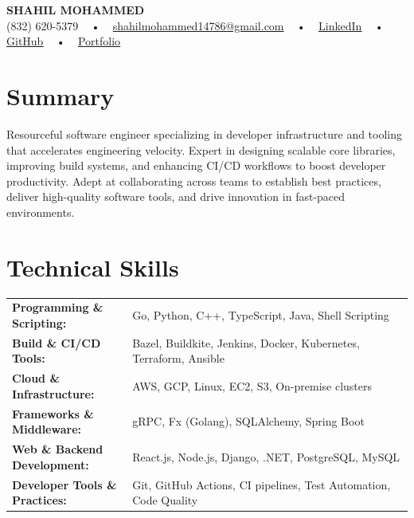 \documentclass[letterpaper,11pt]{article}
\begin{document}
\begin{center}
    {\fontsize{14pt}{12pt}\selectfont \textbf{\MakeUppercase{Shahil Mohammed}}}\\ \vspace{2pt}
    \fontsize{10pt}{12pt}\selectfont (832) 620-5379 ~ • ~ \href{mailto:shahilmohammed14786@gmail.com}{shahilmohammed14786@gmail.com} ~ • ~  
    \href{https://www.linkedin.com/in/shahil-mohammed-9652931a1/}{\color{blue}\underline{LinkedIn}}  ~ • ~ 
    \href{https://github.com/freakbeast14}{\color{blue}\underline{GitHub}} ~ • ~ 
    \href{https://shahil-mohammed.netlify.app/}{\color{blue}\underline{Portfolio}}
    \vspace{-8pt}
\end{center}

\section{Summary}
\fontsize{9pt}{10pt}\selectfont
Resourceful software engineer specializing in developer infrastructure and tooling that accelerates engineering velocity. Expert in designing scalable core libraries, improving build systems, and enhancing CI/CD workflows to boost developer productivity. Adept at collaborating across teams to establish best practices, deliver high-quality software tools, and drive innovation in fast-paced environments.
 \vspace{-5pt}
 
\section{Technical Skills}
        \vspace{-14pt}
        \begin{table}[h]
            \fontsize{9pt}{10pt}\selectfont
            \begin{tabular}{p{0.3\linewidth} p{0.7\linewidth}}
                \textbf{Programming \& Scripting:} & Go, Python, C++, TypeScript, Java, Shell Scripting \\
                \textbf{Build \& CI/CD Tools:} & Bazel, Buildkite, Jenkins, Docker, Kubernetes, Terraform, Ansible \\
                \textbf{Cloud \& Infrastructure:} & AWS, GCP, Linux, EC2, S3, On-premise clusters \\
                \textbf{Frameworks \& Middleware:} & gRPC, Fx (Golang), SQLAlchemy, Spring Boot \\
                \textbf{Web \& Backend Development:} & React.js, Node.js, Django, .NET, PostgreSQL, MySQL \\
                \textbf{Developer Tools \& Practices:} & Git, GitHub Actions, CI pipelines, Test Automation, Code Quality \\
            \end{tabular}
        \end{table}
 \vspace{-15pt}
 
\end{document}
